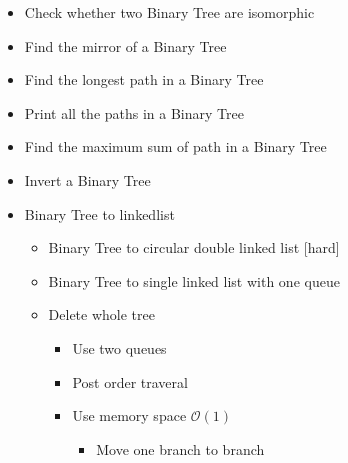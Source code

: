\documentclass{article}
\begin{document}
\begin{enumerate}
\begin{itemize}
    \item Check whether two Binary Tree are isomorphic
    \item Find the mirror of a Binary Tree
    \item Find the longest path in a Binary Tree
    \item Print all the paths in a Binary Tree
    \item Find the maximum sum of path in a Binary Tree
    \item Invert a Binary Tree
    \item Binary Tree to linkedlist
        \begin{itemize}
        \item Binary Tree to circular double linked list [hard]
        \item Binary Tree to single linked list with one queue
        \item Delete whole tree
        \begin{itemize}
        \item Use two queues 
        \item Post order traveral
        \item Use memory space $\mathcal{O}(1)$
        \begin{itemize}
        \item Move one branch to branch 
        \end{itemize} 
        \end{itemize} 
        \end{itemize} 
    \end{itemize} 
\end{enumerate} 
\end{document}
